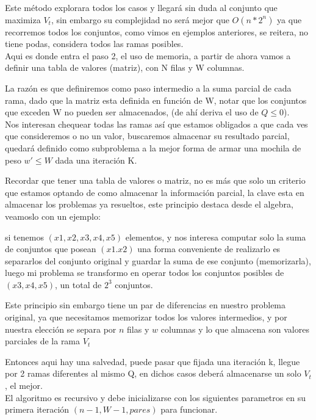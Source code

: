 \documentclass[fleqn, 11pt]{article}
\begin{document}
Este método explorara todos los casos y llegará sin duda al conjunto que maximiza \textit{$V_t$}, sin embargo su complejidad
no será mejor que $O(n * 2^n)$ ya que recorremos todos los conjuntos, como vimos en ejemplos anteriores, se reitera, no tiene podas, considera todos las ramas posibles.\\

Aqui es donde entra el paso 2, el uso de memoria, a partir de ahora vamos a definir una tabla de valores (matriz),
con N filas y W columnas.

La razón es que definiremos como paso intermedio a la suma parcial de cada rama, dado que la matriz esta definida en
función de W, notar que los conjuntos que exceden W no pueden ser almacenados, (de ahí deriva el uso de $Q \leq 0$). \\

Nos interesan chequear todas las ramas así que estamos obligados a que cada ves que consideremos o no un valor, buscaremos almacenar su resultado parcial, quedará definido como subproblema a la mejor forma de armar una mochila de peso $w' \leq W$ dada una iteración K.

Recordar que tener una tabla de valores o matriz, no es más que solo un criterio que estamos optando de como almacenar la información parcial, la clave esta en almacenar los problemas ya resueltos, este principio destaca desde el algebra, veamoslo con un ejemplo:

si tenemos $(x1,x2,x3,x4,x5)$ elementos, y nos interesa computar solo la suma de conjuntos que posean $(x1.x2)$ una forma conveniente de realizarlo es separarlos del conjunto original y guardar la suma de ese conjunto (memorizarla), luego mi problema se transformo en operar todos los conjuntos posibles de $(x3,x4,x5)$, un total de $2^3$ conjuntos.

Este principio sin embargo tiene un par de diferencias en nuestro problema original, ya que necesitamos memorizar todos los valores intermedios, y por nuestra elección se separa por $n$ filas y $w$ columnas y lo que almacena son valores parciales de la rama \textit{$V_t$}

Entonces aqui hay una salvedad, puede pasar que fijada una iteración k, llegue por 2 ramas diferentes al mismo Q,
en dichos casos deberá almacenarse un solo \textit{$V_t$}, el mejor. \\

El algoritmo es recursivo y debe inicializarse con los siguientes parametros en su primera iteración 
$(n-1, W-1, pares)$ para funcionar. 
\end{document}
